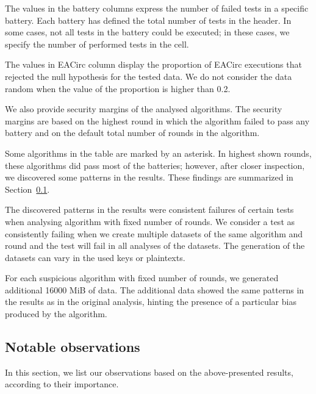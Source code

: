 \documentclass[
  digital,  	%
  color,		%
  oneside,   	%
  12pt,
  nocover,
  notable,
  nolof,
  nolot,
]{fithesis3}
\theoremstyle{definition}
\theoremstyle{remark}
\begin{document}
The values in the battery columns express the number of failed tests in a specific battery. Each battery has defined the total number of tests in the header. In some cases, not all tests in the battery could be executed; in these cases, we specify the number of performed tests in the cell. 

The values in EACirc column display the proportion of EACirc executions that rejected the null hypothesis for the tested data. We do not consider the data random when the value of the proportion is higher than 0.2.

We also provide security margins of the analysed algorithms. The security margins are based on the highest round in which the algorithm failed to pass any battery and on the default total number of rounds in the algorithm.

Some algorithms in the table are marked by an asterisk. In highest shown rounds, these algorithms did pass most of the batteries; however, after closer inspection, we discovered some patterns in the results. These findings are summarized in Section~\ref{sec:notable_results}.

The discovered patterns in the results were consistent failures of certain tests when analysing algorithm with fixed number of rounds. We consider a test as consistently failing when we create multiple datasets of the same algorithm and round and the test will fail in all analyses of the datasets. The generation of the datasets can vary in the used keys or plaintexts.

For each suspicious algorithm with fixed number of rounds, we generated additional 16000 MiB of data. The additional data showed the same patterns in the results as in the original analysis, hinting the presence of a particular bias produced by the algorithm.


\subsection{Notable observations}
\label{sec:notable_results}
In this section, we list our observations based on the above-presented results, according to their importance.
\end{document}
